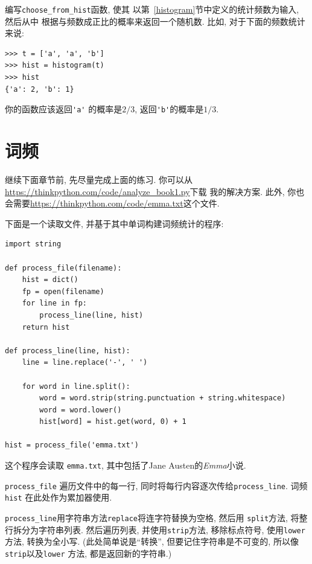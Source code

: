 \documentclass[10pt]{book}
\begin{document}
\begin{exercise}

编写\verb"choose_from_hist"函数, 使其
以第~\ref{histogram}节中定义的统计频数为输入, 然后从中
根据与频数成正比的概率来返回一个随机数. 
比如, 对于下面的频数统计来说:

\begin{verbatim}
>>> t = ['a', 'a', 'b']
>>> hist = histogram(t)
>>> hist
{'a': 2, 'b': 1}
\end{verbatim}
%
你的函数应该返回\verb"'a'" 的概率是$2/3$,  返回\verb"'b'"的概率是$1/3$.
\end{exercise}


\section{词频}

继续下面章节前, 先尽量完成上面的练习. 
你可以从 \url{https://thinkpython.com/code/analyze_book1.py}下载
我的解决方案. 此外, 你也会需要\url{https://thinkpython.com/code/emma.txt}这个文件.

下面是一个读取文件, 并基于其中单词构建词频统计的程序:

\begin{verbatim}
import string

def process_file(filename):
    hist = dict()
    fp = open(filename)
    for line in fp:
        process_line(line, hist)
    return hist

def process_line(line, hist):
    line = line.replace('-', ' ')
    
    for word in line.split():
        word = word.strip(string.punctuation + string.whitespace)
        word = word.lower()
        hist[word] = hist.get(word, 0) + 1

hist = process_file('emma.txt')
\end{verbatim}
%
这个程序会读取 {\tt emma.txt}, 其中包括了Jane Austen的{\em Emma}小说. 

\verb"process_file" 遍历文件中的每一行, 同时将每行内容逐次传给\verb"process_line". 
词频{\tt hist} 在此处作为累加器使用. 

\verb"process_line"用字符串方法{\tt replace}将连字符替换为空格, 然后用
 {\tt split}方法, 将整行拆分为字符串列表. 
然后遍历列表, 并使用{\tt strip}方法, 移除标点符号, 使用{\tt lower}方法, 
转换为全小写. (此处简单说是``转换'', 但要记住字符串是不可变的, 所以像
{\tt strip}以及{\tt lower} 方法, 都是返回新的字符串.)
\end{document}
